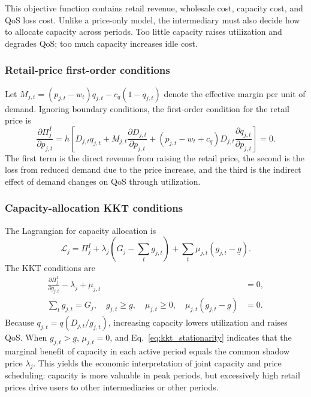\documentclass[11pt,a4paper]{article}
\newcommand{\qos}{q}
\newcommand{\D}{D}
\begin{document}
This objective function contains retail revenue, wholesale cost, capacity cost, and QoS loss cost. Unlike a price-only model, the intermediary must also decide how to allocate capacity across periods. Too little capacity raises utilization and degrades QoS; too much capacity increases idle cost.

\subsubsection{Retail-price first-order conditions}

Let $M_{j,t}=(p_{j,t}-w_t)q_{j,t}-c_q(1-q_{j,t})$ denote the effective margin per unit of demand. Ignoring boundary conditions, the first-order condition for the retail price is
\begin{equation}
  \frac{\partial\Pi^I_j}{\partial p_{j,t}}
  =h\left[
  \D_{j,t}q_{j,t}
  +M_{j,t}\frac{\partial \D_{j,t}}{\partial p_{j,t}}
  +(p_{j,t}-w_t+c_q)\D_{j,t}\frac{\partial q_{j,t}}{\partial p_{j,t}}
  \right]=0.
  \label{eq:retail_foc}
\end{equation}
The first term is the direct revenue from raising the retail price, the second is the loss from reduced demand due to the price increase, and the third is the indirect effect of demand changes on QoS through utilization.

\subsubsection{Capacity-allocation KKT conditions}

The Lagrangian for capacity allocation is
\begin{equation}
  \mathcal{L}_j=\Pi^I_j+\lambda_j\left(G_j-\sum_t g_{j,t}\right)
  +\sum_t \mu_{j,t}(g_{j,t}-\underline g).
  \label{eq:broker_lagrangian}
\end{equation}
The KKT conditions are
\begin{align}
  \frac{\partial\Pi^I_j}{\partial g_{j,t}}-\lambda_j+\mu_{j,t}&=0,
  \label{eq:kkt_stationarity}\\
  \sum_t g_{j,t}=G_j,\quad g_{j,t}\ge \underline g,\quad \mu_{j,t}\ge 0,\quad
  \mu_{j,t}(g_{j,t}-\underline g)&=0. \label{eq:kkt_complementarity}
\end{align}
Because $q_{j,t}=\qos(\D_{j,t}/g_{j,t})$, increasing capacity lowers utilization and raises QoS. When $g_{j,t}>\underline g$, $\mu_{j,t}=0$, and Eq.~\eqref{eq:kkt_stationarity} indicates that the marginal benefit of capacity in each active period equals the common shadow price $\lambda_j$. This yields the economic interpretation of joint capacity and price scheduling: capacity is more valuable in peak periods, but excessively high retail prices drive users to other intermediaries or other periods.
\end{document}
